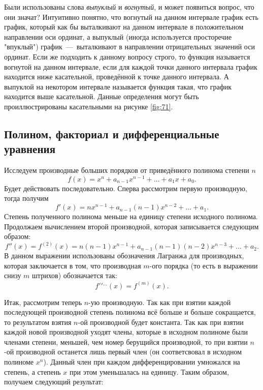 \documentclass[12pt]{article}
\begin{document}
Были использованы слова \emph{выпуклый} и \emph{вогнутый}, и может появиться вопрос, что они значат? Интуитивно понятно, что вогнутый на данном интервале график есть график, который как бы выталкивают на данном интервале в положительном направлении оси ординат, а выпуклый (иногда используется просторечие "впуклый") график~\----~выталкивают в направлении отрицательных значений оси ординат. Если же подходить к данному вопросу строго, то функция называется вогнутой на данном интервале, если для каждой точки данного интервала график находится ниже касательной, проведённой к точке данного интервала. А выпуклой на некотором интервале называется функция такая, что график находится выше касательной. Данные определения могут быть проиллюстрированы касательными на рисунке \ref{fig:71}. 

\subsection{Полином, факториал и дифференциальные уравнения}
Исследуем производные больших порядков от приведённого полинома степени $n$
\begin{equation}
	f(x) = x^n + a_{n-1} x^{n-1} + \ldots + a_1 x + a_0.
\end{equation}
Будет действовать последовательно. Сперва рассмотрим первую производную, тогда получим
\begin{equation}
	f'(x) = nx^{n-1} + a_{n-1} (n-1) x^{n-2} + \ldots + a_1.
\end{equation}
Степень полученного полинома меньше на единицу степени исходного полинома. Продолжаем вычислением второй производной, которая записывается следующим образом:
\begin{equation}
	f''(x) = f^{(2)}(x) = n (n-1) x^{n-1} + a_{n-1} (n-1) (n-2) x^{n-3} + \ldots + a_2.
\end{equation}
В данном выражении использованы обозначения Лагранжа для производных, которая заключается в том, что производная $m$\--ого порядка (то есть в выражении снизу $m$ штрихов) обозначается так:
\begin{equation}
	f{}' {}' {}^{\ldots}(x) = f^{(m)}(x).
\end{equation}

Итак, рассмотрим теперь $n$\--ую производную. Так как при взятии каждой последующей производной степень полинома всё больше и больше сокращается, то результатом взятия $n$\--ой производной будет константа. Так как при взятии каждой новой производной уходят члены, которые в исходном полиноме были членами степени, меньшей, чем номер берущийся производной, то при взятии $n$\--ой производной останется лишь первый член (он соответсвовал в исходном полиноме $x^n$). Данный член при каждом дифференцировании умножался на степень, а степень $x$ при этом уменьшалась на единицу. Таким образом, получаем следующий результат:
\end{document}
